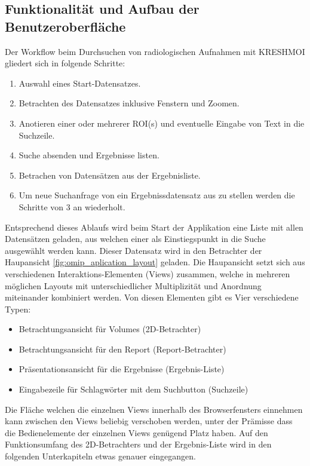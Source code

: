 \subsection{Funktionalität und Aufbau der Benutzeroberfläche}
\label{sec:Funktionalität und Aufbau der Benutzeroberfläche}
Der Workflow beim Durchsuchen von radiologischen Aufnahmen mit KRESHMOI gliedert sich in folgende Schritte:
\begin{enumerate}
	\item Auswahl eines Start-Datensatzes.
	\item Betrachten des Datensatzes inklusive Fenstern und Zoomen.
	\item Anotieren einer oder mehrerer ROI(s) und eventuelle Eingabe von Text in die Suchzeile.
	\item Suche absenden und Ergebnisse listen.
	\item Betrachen von Datensätzen aus der Ergebnisliste.
	\item Um neue Suchanfrage von ein Ergebnissdatensatz aus zu stellen werden die Schritte von 3 an wiederholt.
\end{enumerate}
Entsprechend dieses Ablaufs wird beim Start der Applikation eine Liste mit allen Datensätzen geladen, 
aus welchen einer als Einstiegspunkt in die Suche ausgewählt werden kann.
Dieser Datensatz wird in den Betrachter der Haupansicht \ref{fig:omip_aplication_layout} geladen.
Die Haupansicht setzt sich aus verschiedenen Interaktions-Elementen (Views) zusammen,
welche in mehreren möglichen Layouts mit unterschiedlicher Multiplizität und Anordnung miteinander kombiniert werden.
Von diesen Elementen gibt es Vier verschiedene Typen:
\begin{itemize}
	\item Betrachtungsansicht für Volumes (2D-Betrachter)
	\item Betrachtungsansicht für den Report (Report-Betrachter)
	\item Präsentationsansicht für die Ergebnisse (Ergebnis-Liste)
	\item Eingabezeile für Schlagwörter mit dem Suchbutton (Suchzeile)
\end{itemize}
Die Fläche welchen die einzelnen Views innerhalb des Browserfensters einnehmen kann zwischen den Views beliebig verschoben werden, 
unter der Prämisse dass die Bedienelemente der einzelnen Views genügend Platz haben.
Auf den Funktionsumfang des 2D-Betrachters und der Ergebnis-Liste wird in den folgenden Unterkapiteln etwas genauer eingegangen.
